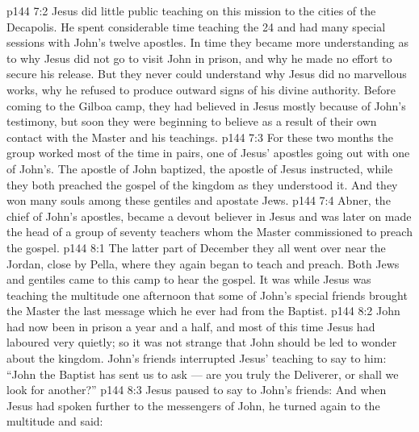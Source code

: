\vs p144 7:2 Jesus did little public teaching on this mission to the cities of the Decapolis. He spent considerable time teaching the 24 and had many special sessions with John’s twelve apostles. In time they became more understanding as to why Jesus did not go to visit John in prison, and why he made no effort to secure his release. But they never could understand why Jesus did no marvellous works, why he refused to produce outward signs of his divine authority. Before coming to the Gilboa camp, they had believed in Jesus mostly because of John’s testimony, but soon they were beginning to believe as a result of their own contact with the Master and his teachings.
\vs p144 7:3 For these two months the group worked most of the time in pairs, one of Jesus’ apostles going out with one of John’s. The apostle of John baptized, the apostle of Jesus instructed, while they both preached the gospel of the kingdom as they understood it. And they won many souls among these gentiles and apostate Jews.
\vs p144 7:4 Abner, the chief of John’s apostles, became a devout believer in Jesus and was later on made the head of a group of seventy teachers whom the Master commissioned to preach the gospel.
\vs p144 8:1 The latter part of December they all went over near the Jordan, close by Pella, where they again began to teach and preach. Both Jews and gentiles came to this camp to hear the gospel. It was while Jesus was teaching the multitude one afternoon that some of John’s special friends brought the Master the last message which he ever had from the Baptist.
\vs p144 8:2 John had now been in prison a year and a half, and most of this time Jesus had laboured very quietly; so it was not strange that John should be led to wonder about the kingdom. John’s friends interrupted Jesus’ teaching to say to him: “John the Baptist has sent us to ask --- are you truly the Deliverer, or shall we look for another?”
\vs p144 8:3 Jesus paused to say to John’s friends:  And when Jesus had spoken further to the messengers of John, he turned again to the multitude and said: 
